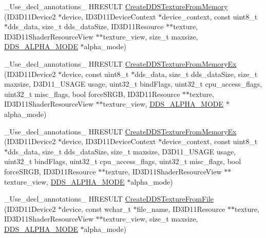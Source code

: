 \begin{DoxyCompactItemize}
\item 
\+\_\+\+Use\+\_\+decl\+\_\+annotations\+\_\+ H\+R\+E\+S\+U\+LT \hyperlink{namespacemage_ad4aea1524bc1c8262da263d10cea5b5d}{Create\+D\+D\+S\+Texture\+From\+Memory} (I\+D3\+D11\+Device2 $\ast$device, I\+D3\+D11\+Device\+Context $\ast$device\+\_\+context, const uint8\+\_\+t $\ast$dds\+\_\+data, size\+\_\+t dds\+\_\+data\+Size, I\+D3\+D11\+Resource $\ast$$\ast$texture, I\+D3\+D11\+Shader\+Resource\+View $\ast$$\ast$texture\+\_\+view, size\+\_\+t maxsize, \hyperlink{namespacemage_a0c586a2bad862f4858900ca121ca80c2}{D\+D\+S\+\_\+\+A\+L\+P\+H\+A\+\_\+\+M\+O\+DE} $\ast$alpha\+\_\+mode)
\item 
\+\_\+\+Use\+\_\+decl\+\_\+annotations\+\_\+ H\+R\+E\+S\+U\+LT \hyperlink{namespacemage_ad29f0d5028acb22c5f5e1a333e6a622b}{Create\+D\+D\+S\+Texture\+From\+Memory\+Ex} (I\+D3\+D11\+Device2 $\ast$device, const uint8\+\_\+t $\ast$dds\+\_\+data, size\+\_\+t dds\+\_\+data\+Size, size\+\_\+t maxsize, D3\+D11\+\_\+\+U\+S\+A\+GE usage, uint32\+\_\+t bind\+Flags, uint32\+\_\+t cpu\+\_\+access\+\_\+flags, uint32\+\_\+t misc\+\_\+flags, bool force\+S\+R\+GB, I\+D3\+D11\+Resource $\ast$$\ast$texture, I\+D3\+D11\+Shader\+Resource\+View $\ast$$\ast$texture\+\_\+view, \hyperlink{namespacemage_a0c586a2bad862f4858900ca121ca80c2}{D\+D\+S\+\_\+\+A\+L\+P\+H\+A\+\_\+\+M\+O\+DE} $\ast$alpha\+\_\+mode)
\item 
\+\_\+\+Use\+\_\+decl\+\_\+annotations\+\_\+ H\+R\+E\+S\+U\+LT \hyperlink{namespacemage_ad5d3e9d297c74e18a84a3c1d9311e6a9}{Create\+D\+D\+S\+Texture\+From\+Memory\+Ex} (I\+D3\+D11\+Device2 $\ast$device, I\+D3\+D11\+Device\+Context $\ast$device\+\_\+context, const uint8\+\_\+t $\ast$dds\+\_\+data, size\+\_\+t dds\+\_\+data\+Size, size\+\_\+t maxsize, D3\+D11\+\_\+\+U\+S\+A\+GE usage, uint32\+\_\+t bind\+Flags, uint32\+\_\+t cpu\+\_\+access\+\_\+flags, uint32\+\_\+t misc\+\_\+flags, bool force\+S\+R\+GB, I\+D3\+D11\+Resource $\ast$$\ast$texture, I\+D3\+D11\+Shader\+Resource\+View $\ast$$\ast$texture\+\_\+view, \hyperlink{namespacemage_a0c586a2bad862f4858900ca121ca80c2}{D\+D\+S\+\_\+\+A\+L\+P\+H\+A\+\_\+\+M\+O\+DE} $\ast$alpha\+\_\+mode)
\item 
\+\_\+\+Use\+\_\+decl\+\_\+annotations\+\_\+ H\+R\+E\+S\+U\+LT \hyperlink{namespacemage_a3a3965b1c7679947007304baf7ba0cde}{Create\+D\+D\+S\+Texture\+From\+File} (I\+D3\+D11\+Device2 $\ast$device, const wchar\+\_\+t $\ast$file\+\_\+name, I\+D3\+D11\+Resource $\ast$$\ast$texture, I\+D3\+D11\+Shader\+Resource\+View $\ast$$\ast$texture\+\_\+view, size\+\_\+t maxsize, \hyperlink{namespacemage_a0c586a2bad862f4858900ca121ca80c2}{D\+D\+S\+\_\+\+A\+L\+P\+H\+A\+\_\+\+M\+O\+DE} $\ast$alpha\+\_\+mode)

\end{DoxyCompactItemize}
